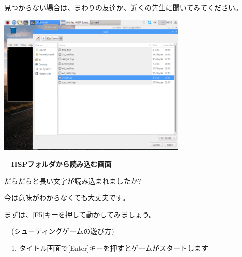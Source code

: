 \documentclass[a4paper,dvipdfmx]{jarticle}
\begin{document}
見つからない場合は、まわりの友達か、近くの先生に聞いてみてください。


\bigskip



\begin{center}
\includegraphics[width=9.181cm,height=6.874cm]{text02-img/text02-img011.png}

\end{center}

\bigskip


\bigskip


\bigskip


\bigskip


\bigskip


\bigskip


\bigskip


\bigskip


\bigskip


\bigskip


\bigskip


\bigskip

{\bfseries
　HSPフォルダから読み込む画面}


\bigskip


\bigskip


\bigskip


\bigskip


\bigskip

だらだらと長い文字が読み込まれましたか?

今は意味がわからなくても大丈夫です。

まずは、[F5]キーを押して動かしてみましょう。


\bigskip

\ \ (シューティングゲームの遊び方)


\bigskip

\ \ 1.
タイトル画面で[Enter]キーを押すとゲームがスタートします
\end{document}
